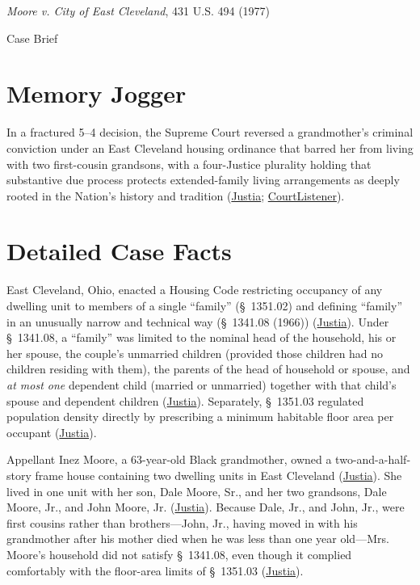 \documentclass[12pt]{article}
\begin{document}
\begin{center}
{\LARGE \textit{Moore v. City of East Cleveland}, 431 U.S. 494 (1977)\par}
\vspace{0.8em}
{\large Case Brief\par}
\end{center}
\vspace{1em}

\section{Memory Jogger}
In a fractured 5--4 decision, the Supreme Court reversed a grandmother's criminal conviction under an East Cleveland housing ordinance that barred her from living with two first-cousin grandsons, with a four-Justice plurality holding that substantive due process protects extended-family living arrangements as deeply rooted in the Nation's history and tradition (\href{https://supreme.justia.com/cases/federal/us/431/494/}{Justia}; \href{https://www.courtlistener.com/opinion/109670/moore-v-city-of-east-cleveland/}{CourtListener}).

\section{Detailed Case Facts}
East Cleveland, Ohio, enacted a Housing Code restricting occupancy of any dwelling unit to members of a single ``family'' (\S~1351.02) and defining ``family'' in an unusually narrow and technical way (\S~1341.08 (1966)) (\href{https://supreme.justia.com/cases/federal/us/431/494/}{Justia}). Under \S~1341.08, a ``family'' was limited to the nominal head of the household, his or her spouse, the couple's unmarried children (provided those children had no children residing with them), the parents of the head of household or spouse, and \textit{at most one} dependent child (married or unmarried) together with that child's spouse and dependent children (\href{https://supreme.justia.com/cases/federal/us/431/494/}{Justia}). Separately, \S~1351.03 regulated population density directly by prescribing a minimum habitable floor area per occupant (\href{https://supreme.justia.com/cases/federal/us/431/494/}{Justia}).

Appellant Inez Moore, a 63-year-old Black grandmother, owned a two-and-a-half-story frame house containing two dwelling units in East Cleveland (\href{https://supreme.justia.com/cases/federal/us/431/494/}{Justia}). She lived in one unit with her son, Dale Moore, Sr., and her two grandsons, Dale Moore, Jr., and John Moore, Jr. (\href{https://supreme.justia.com/cases/federal/us/431/494/}{Justia}). Because Dale, Jr., and John, Jr., were first cousins rather than brothers---John, Jr., having moved in with his grandmother after his mother died when he was less than one year old---Mrs. Moore's household did not satisfy \S~1341.08, even though it complied comfortably with the floor-area limits of \S~1351.03 (\href{https://supreme.justia.com/cases/federal/us/431/494/}{Justia}).
\end{document}
